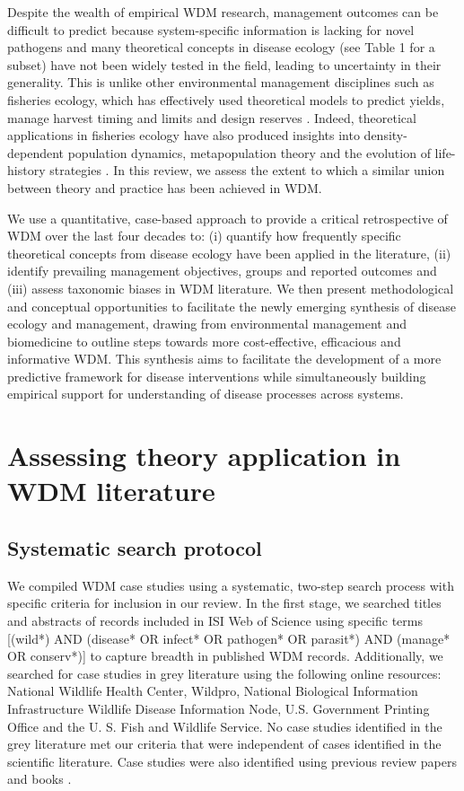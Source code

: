Despite the wealth of empirical WDM research, management outcomes can be difficult to predict because system-specific information is lacking for novel pathogens and many theoretical concepts in disease ecology (see Table 1 for a subset) have not been widely tested in the field, leading to uncertainty in their generality.
This is unlike other environmental management disciplines such as fisheries ecology, which has effectively used theoretical models to predict yields, manage harvest timing and limits and design reserves \citep{Gerber2003}.
Indeed, theoretical applications in fisheries ecology have also produced insights into density-dependent population dynamics, metapopulation theory and the evolution of life-history strategies \citep{frank1994fisheries}.
In this review, we assess the extent to which a similar union between theory and practice has been achieved in WDM.

We use a quantitative, case-based approach to provide a critical retrospective of WDM over the last four decades to: (i) quantify how frequently specific theoretical concepts from disease ecology have been applied in the literature, (ii) identify prevailing management objectives, groups and reported outcomes and (iii) assess taxonomic biases in WDM literature. We then present methodological and conceptual opportunities to facilitate the newly emerging synthesis of disease ecology and management, drawing from environmental management and biomedicine to outline steps towards more cost-effective, efficacious and informative WDM. This synthesis aims to facilitate the development of a more predictive framework for disease interventions while simultaneously building empirical support for understanding of disease processes across systems.

\section{Assessing theory application in WDM literature}

\subsection{Systematic search protocol}

We compiled WDM case studies using a systematic, two-step search process with specific criteria for inclusion in our review. In the first stage, we searched titles and abstracts of records included in ISI Web of Science using specific terms [(wild*) AND (disease* OR infect* OR pathogen* OR parasit*) AND (manage* OR conserv*)] to capture breadth in published WDM records.
Additionally, we searched for case studies in grey literature using the following online resources: National Wildlife Health Center, Wildpro, National Biological Information Infrastructure Wildlife Disease Information Node, U.S. Government Printing Office and the U. S. Fish and Wildlife Service.
No case studies identified in the grey literature met our criteria that were independent of cases identified in the scientific literature.
Case studies were also identified using previous review papers and books \citep{Lafferty2002a, wobeser2002, hudson2002ecology, Keesing2006, wobeser2013investigation}.

